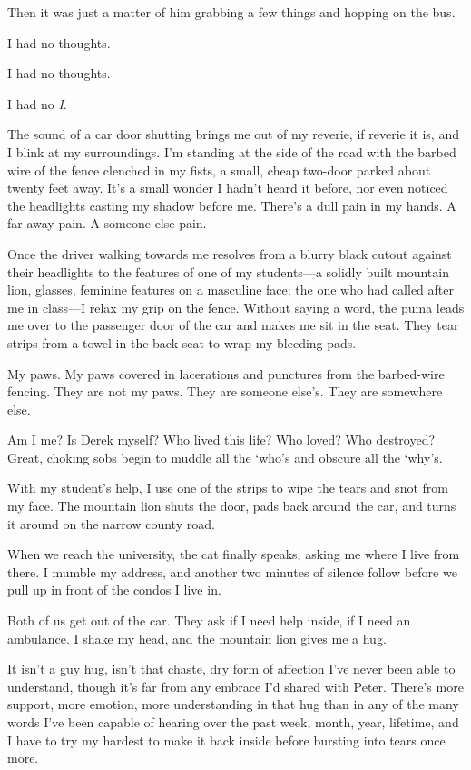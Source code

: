 Then it was just a matter of him grabbing a few things and hopping on the bus.

I had no thoughts.

I had no thoughts.

I had no \emph{I}.

\secdiv{}

\noindent The sound of a car door shutting brings me out of my reverie, if reverie it is, and I blink at my surroundings. I'm standing at the side of the road with the barbed wire of the fence clenched in my fists, a small, cheap two-door parked about twenty feet away. It's a small wonder I hadn't heard it before, nor even noticed the headlights casting my shadow before me. There's a dull pain in my hands. A far away pain. A someone-else pain.

Once the driver walking towards me resolves from a blurry black cutout against their headlights to the features of one of my students---a solidly built mountain lion, glasses, feminine features on a masculine face; the one who had called after me in class---I relax my grip on the fence. Without saying a word, the puma leads me over to the passenger door of the car and makes me sit in the seat. They tear strips from a towel in the back seat to wrap my bleeding pads.

My paws. My paws covered in lacerations and punctures from the barbed-wire fencing. They are not my paws. They are someone else's. They are somewhere else.

Am I me? Is Derek myself? Who lived this life? Who loved? Who destroyed? Great, choking sobs begin to muddle all the `who's and obscure all the `why's.

With my student's help, I use one of the strips to wipe the tears and snot from my face. The mountain lion shuts the door, pads back around the car, and turns it around on the narrow county road.

When we reach the university, the cat finally speaks, asking me where I live from there. I mumble my address, and another two minutes of silence follow before we pull up in front of the condos I live in.

Both of us get out of the car. They ask if I need help inside, if I need an ambulance. I shake my head, and the mountain lion gives me a hug.

It isn't a guy hug, isn't that chaste, dry form of affection I've never been able to understand, though it's far from any embrace I'd shared with Peter. There's more support, more emotion, more understanding in that hug than in any of the many words I've been capable of hearing over the past week, month, year, lifetime, and I have to try my hardest to make it back inside before bursting into tears once more.

